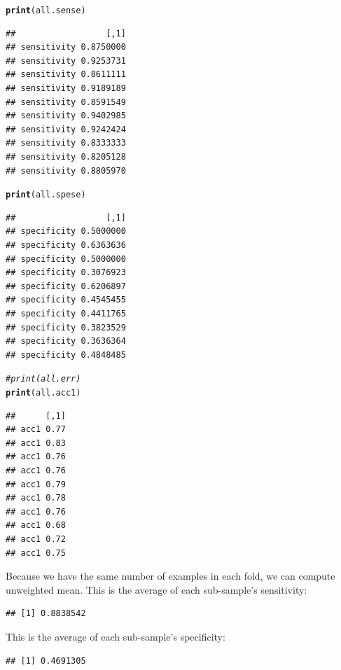 \documentclass{article}\usepackage[]{graphicx}\usepackage[]{color}
\makeatletter
\newcommand{\hlcom}[1]{\textcolor[rgb]{0.678,0.584,0.686}{\textit{#1}}}%
\newcommand{\hlstd}[1]{\textcolor[rgb]{0.345,0.345,0.345}{#1}}%
\newcommand{\hlkwd}[1]{\textcolor[rgb]{0.737,0.353,0.396}{\textbf{#1}}}%
\newenvironment{kframe}{%
 \def\at@end@of@kframe{}%
 \ifinner\ifhmode%
  \def\at@end@of@kframe{\end{minipage}}%
  \begin{minipage}{\columnwidth}%
 \fi\fi%
 \def\FrameCommand##1{\hskip\@totalleftmargin \hskip-\fboxsep
 \colorbox{shadecolor}{##1}\hskip-\fboxsep
     \hskip-\linewidth \hskip-\@totalleftmargin \hskip\columnwidth}%
 \MakeFramed {\advance\hsize-\width
   \@totalleftmargin\z@ \linewidth\hsize
   \@setminipage}}%
 {\par\unskip\endMakeFramed%
 \at@end@of@kframe}
\newenvironment{knitrout}{}{} %
\makeatother
\begin{document}
\begin{knitrout}
\color{fgcolor}\begin{kframe}
\begin{alltt}
\hlkwd{print}\hlstd{(all.sense)}
\end{alltt}
\begin{verbatim}
##                  [,1]
## sensitivity 0.8750000
## sensitivity 0.9253731
## sensitivity 0.8611111
## sensitivity 0.9189189
## sensitivity 0.8591549
## sensitivity 0.9402985
## sensitivity 0.9242424
## sensitivity 0.8333333
## sensitivity 0.8205128
## sensitivity 0.8805970
\end{verbatim}
\begin{alltt}
\hlkwd{print}\hlstd{(all.spese)}
\end{alltt}
\begin{verbatim}
##                  [,1]
## specificity 0.5000000
## specificity 0.6363636
## specificity 0.5000000
## specificity 0.3076923
## specificity 0.6206897
## specificity 0.4545455
## specificity 0.4411765
## specificity 0.3823529
## specificity 0.3636364
## specificity 0.4848485
\end{verbatim}
\begin{alltt}
\hlcom{#print(all.err)}
\hlkwd{print}\hlstd{(all.acc1)}
\end{alltt}
\begin{verbatim}
##      [,1]
## acc1 0.77
## acc1 0.83
## acc1 0.76
## acc1 0.76
## acc1 0.79
## acc1 0.78
## acc1 0.76
## acc1 0.68
## acc1 0.72
## acc1 0.75
\end{verbatim}
\end{kframe}
\end{knitrout}
Because we have the same number of examples in each fold, we can compute unweighted mean. This is the average of each sub-sample's sensitivity:
\begin{knitrout}
\color{fgcolor}\begin{kframe}
\begin{verbatim}
## [1] 0.8838542
\end{verbatim}
\end{kframe}
\end{knitrout}
This is the average of each sub-sample's specificity:
\begin{knitrout}
\color{fgcolor}\begin{kframe}
\begin{verbatim}
## [1] 0.4691305
\end{verbatim}
\end{kframe}
\end{knitrout}
\end{document}
